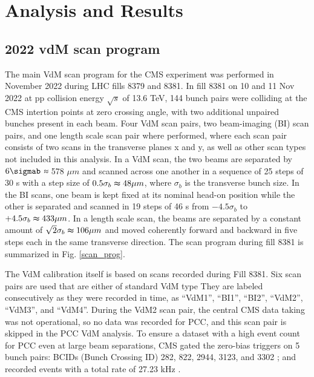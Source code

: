 \chapter{Analysis and Results}

\section{2022 vdM scan program}

The main VdM scan program for the CMS experiment was performed in November 2022 during LHC fills 8379 and 8381. In fill 8381 on 10 and  11 Nov 2022 at pp collision energy $\sqrt{s}$ of 13.6 TeV, 144 bunch pairs were colliding at the CMS intertion points at zero crossing angle, with two additional unpaired bunches present in each beam. Four VdM scan pairs, two beam-imaging (BI) scan pairs, and one length scale scan pair where performed, where each scan pair consists of two scans in the transverse planes x and y, as well as other scan types not included in this analysis. In a VdM scan, the two beams are separated by $6\sigmab$ ≈ 578 $\mu m$ and scanned across one another in a sequence of 25 steps of 30 s with a step size of $0.5\sigma_{b} \thickapprox 48 \mu m$, where $\sigma_{b}$ is the transverse bunch size. In the BI scans, one beam is kept fixed at its nominal head-on position while the other is separated and scanned in 19 steps of 46 s from $-4.5\sigma_{b}$ to $+4.5\sigma_{b} \thickapprox 433 \mu m$. In a length scale scan, the beams are separated by a constant amount of $\sqrt{2} \sigma_{b} \thickapprox  106 \mu m$  and moved coherently forward and backward in five steps each in the same transverse direction. The scan program during fill 8381 is summarized in Fig. \ref{scan_prog}.

The VdM calibration itself is based on scans recorded during Fill 8381. Six scan pairs are used that are either of standard VdM type They are labeled consecutively as they were recorded in time, as “VdM1”, “BI1”, “BI2”, “VdM2”, “VdM3”, and “VdM4”. During the VdM2 scan pair, the central CMS data taking was not operational, so no data was recorded for PCC, and this scan pair is skipped in the PCC VdM analysis. To ensure a dataset with a high event count for PCC even at large beam separations, CMS gated the zero-bias triggers on 5 bunch pairs: BCIDs (Bunch Crossing ID) 282, 822, 2944, 3123, and 3302 ; and recorded events with a total rate of 27.23 kHz .


